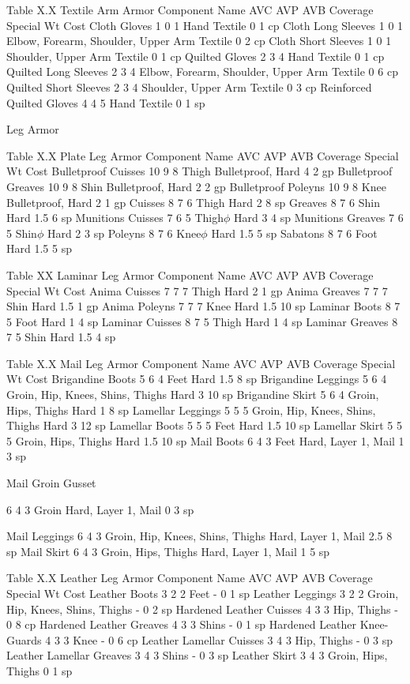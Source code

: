 \documentclass[oneside,11pt,english]{book}
\begin{document}
 
Table X.X Textile Arm Armor 
Component Name AVC AVP AVB Coverage Special Wt Cost 
Cloth Gloves 1 0 1 Hand Textile 0 1 cp 
Cloth Long Sleeves 1 0 1 Elbow, Forearm, Shoulder, Upper Arm Textile 0 2 cp 
Cloth Short Sleeves 1 0 1 Shoulder, Upper Arm Textile 0 1 cp 
Quilted Gloves 2 3 4 Hand Textile 0 1 cp 
Quilted Long Sleeves 2 3 4 Elbow, Forearm, Shoulder, Upper Arm Textile 0 6 cp 
Quilted Short Sleeves 2 3 4 Shoulder, Upper Arm Textile 0 3 cp 
Reinforced Quilted Gloves 4 4 5 Hand Textile 0 1 sp 

 


Leg Armor 

 

Table X.X Plate Leg Armor 
Component Name AVC AVP AVB Coverage Special Wt Cost 
Bulletproof Cuisses 10 9 8 Thigh Bulletproof, Hard 4 2 gp 
Bulletproof Greaves 10 9 8 Shin Bulletproof, Hard 2 2 gp 
Bulletproof Poleyns 10 9 8 Knee Bulletproof, Hard 2 1 gp 
Cuisses 8 7 6 Thigh Hard 2 8 sp 
Greaves 8 7 6 Shin Hard 1.5 6 sp 
Munitions Cuisses 7 6 5 Thigh$\phi$ Hard 3 4 sp 
Munitions Greaves 7 6 5 Shin$\phi$ Hard 2 3 sp 
Poleyns 8 7 6 Knee$\phi$ Hard 1.5 5 sp 
Sabatons 8 7 6 Foot Hard 1.5 5 sp 

 
Table XX Laminar Leg Armor 
Component Name AVC AVP AVB Coverage Special Wt Cost 
Anima Cuisses 7 7 7 Thigh Hard 2 1 gp 
Anima Greaves 7 7 7 Shin Hard 1.5 1 gp 
Anima Poleyns 7 7 7 Knee Hard 1.5 10 sp 
Laminar Boots 8 7 5 Foot Hard 1 4 sp 
Laminar Cuisses 8 7 5 Thigh Hard 1 4 sp 
Laminar Greaves 8 7 5 Shin Hard 1.5 4 sp 

 
Table X.X Mail Leg Armor 
Component Name AVC AVP AVB Coverage Special Wt Cost 
Brigandine Boots 5 6 4 Feet Hard 1.5 8 sp 
Brigandine Leggings 5 6 4 Groin, Hip, Knees, Shins, Thighs Hard 3 10 sp 
Brigandine Skirt 5 6 4 Groin, Hips, Thighs Hard 1 8 sp 
Lamellar Leggings 5 5 5 Groin, Hip, Knees, Shins, Thighs Hard 3 12 sp 
Lamellar Boots 5 5 5 Feet Hard 1.5 10 sp 
Lamellar Skirt 5 5 5 Groin, Hips, Thighs Hard 1.5 10 sp 
Mail Boots 6 4 3 Feet Hard, Layer 1, Mail 1 3 sp 


Mail Groin 
Gusset 

6 4 3 Groin Hard, Layer 1, Mail 0 3 sp 

Mail Leggings 6 4 3 Groin, Hip, Knees, Shins, Thighs Hard, Layer 1, Mail 2.5 8 sp 
Mail Skirt 6 4 3 Groin, Hips, Thighs Hard, Layer 1, Mail 1 5 sp 
 
Table X.X Leather Leg Armor 
Component Name AVC AVP AVB Coverage Special Wt Cost 
Leather Boots 3 2 2 Feet - 0 1 sp 
Leather Leggings 3 2 2 Groin, Hip, Knees, Shins, Thighs - 0 2 sp 
Hardened Leather Cuisses 4 3 3 Hip, Thighs - 0 8 cp 
Hardened Leather Greaves 4 3 3 Shins - 0 1 sp 
Hardened Leather Knee-Guards 4 3 3 Knee - 0 6 cp 
Leather Lamellar Cuisses 3 4 3 Hip, Thighs - 0 3 sp 
Leather Lamellar Greaves 3 4 3 Shins - 0 3 sp 
Leather Skirt 3 4 3 Groin, Hips, Thighs 0 1 sp 
\end{document}
